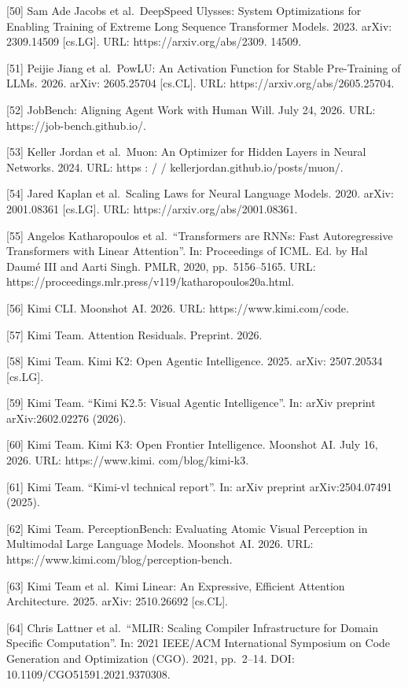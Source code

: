 \documentclass[
  10
]{article}
\begin{document}
{[}50{]} Sam Ade Jacobs et al.~DeepSpeed Ulysses: System Optimizations
for Enabling Training of Extreme Long Sequence Transformer Models. 2023.
arXiv: 2309.14509 {[}cs.LG{]}. URL: https://arxiv.org/abs/2309. 14509.

{[}51{]} Peijie Jiang et al.~PowLU: An Activation Function for Stable
Pre-Training of LLMs. 2026. arXiv: 2605.25704 {[}cs.CL{]}. URL:
https://arxiv.org/abs/2605.25704.

{[}52{]} JobBench: Aligning Agent Work with Human Will. July 24, 2026.
URL: https://job-bench.github.io/.

{[}53{]} Keller Jordan et al.~Muon: An Optimizer for Hidden Layers in
Neural Networks. 2024. URL: https : / /
kellerjordan.github.io/posts/muon/.

{[}54{]} Jared Kaplan et al.~Scaling Laws for Neural Language Models.
2020. arXiv: 2001.08361 {[}cs.LG{]}. URL:
https://arxiv.org/abs/2001.08361.

{[}55{]} Angelos Katharopoulos et al.~``Transformers are RNNs: Fast
Autoregressive Transformers with Linear Attention''. In: Proceedings of
ICML. Ed. by Hal Daumé III and Aarti Singh. PMLR, 2020, pp.~5156--5165.
URL: https://proceedings.mlr.press/v119/katharopoulos20a.html.

{[}56{]} Kimi CLI. Moonshot AI. 2026. URL: https://www.kimi.com/code.

{[}57{]} Kimi Team. Attention Residuals. Preprint. 2026.

{[}58{]} Kimi Team. Kimi K2: Open Agentic Intelligence. 2025. arXiv:
2507.20534 {[}cs.LG{]}.

{[}59{]} Kimi Team. ``Kimi K2.5: Visual Agentic Intelligence''. In:
arXiv preprint arXiv:2602.02276 (2026).

{[}60{]} Kimi Team. Kimi K3: Open Frontier Intelligence. Moonshot AI.
July 16, 2026. URL: https://www.kimi. com/blog/kimi-k3.

{[}61{]} Kimi Team. ``Kimi-vl technical report''. In: arXiv preprint
arXiv:2504.07491 (2025).

{[}62{]} Kimi Team. PerceptionBench: Evaluating Atomic Visual Perception
in Multimodal Large Language Models. Moonshot AI. 2026. URL:
https://www.kimi.com/blog/perception-bench.

{[}63{]} Kimi Team et al.~Kimi Linear: An Expressive, Efficient
Attention Architecture. 2025. arXiv: 2510.26692 {[}cs.CL{]}.

{[}64{]} Chris Lattner et al.~``MLIR: Scaling Compiler Infrastructure
for Domain Specific Computation''. In: 2021 IEEE/ACM International
Symposium on Code Generation and Optimization (CGO). 2021, pp.~2--14.
DOI: 10.1109/CGO51591.2021.9370308.
\end{document}
